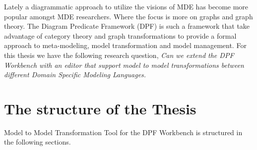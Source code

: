 Lately a diagrammatic approach to utilize the visions of MDE has become more
popular amongst MDE researchers. Where the focus is more on graphs and graph
theory. The Diagram Predicate Framework (DPF) is such a framework that take
advantage of category theory and graph transformations to provide a formal
approach to meta-modeling, model transformation and model management. For this
thesis we have the following research question, \textit{Can we extend the DPF
Workbench with an editor that support model to model transformations between
different Domain Specific Modeling Languages.}

% 
% 
% 



\section{The structure of the Thesis}

Model to Model Transformation Tool for the DPF Workbench is structured in the
following sections.

